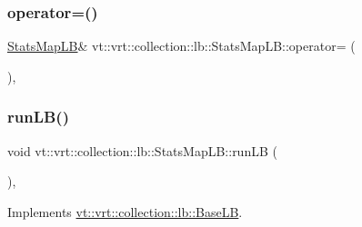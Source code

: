 \mbox{\label{structvt_1_1vrt_1_1collection_1_1lb_1_1_stats_map_l_b_aee5bfc8e45ac47056b8b22128bc0f86e}} 
\subsubsection{\texorpdfstring{operator=()}{operator=()}\hspace{0.1cm}{\footnotesize\ttfamily [2/2]}}
{\footnotesize\ttfamily \hyperlink{structvt_1_1vrt_1_1collection_1_1lb_1_1_stats_map_l_b}{Stats\+Map\+LB}\& vt\+::vrt\+::collection\+::lb\+::\+Stats\+Map\+L\+B\+::operator= (\begin{DoxyParamCaption}\item[{\hyperlink{structvt_1_1vrt_1_1collection_1_1lb_1_1_stats_map_l_b}{Stats\+Map\+LB} \&\&}]{ }\end{DoxyParamCaption})\hspace{0.3cm}{\ttfamily [default]}, {\ttfamily [noexcept]}}

\mbox{\label{structvt_1_1vrt_1_1collection_1_1lb_1_1_stats_map_l_b_a74ab28f522582cc78f77f2916884c6d8}} 
\subsubsection{\texorpdfstring{run\+L\+B()}{runLB()}}
{\footnotesize\ttfamily void vt\+::vrt\+::collection\+::lb\+::\+Stats\+Map\+L\+B\+::run\+LB (\begin{DoxyParamCaption}\item[{\hyperlink{namespacevt_a876a9d0cd5a952859c72de8a46881442}{Time\+Type}}]{ }\end{DoxyParamCaption})\hspace{0.3cm}{\ttfamily [override]}, {\ttfamily [virtual]}}



Implements \hyperlink{structvt_1_1vrt_1_1collection_1_1lb_1_1_base_l_b_a7caaf2483f046927fd7534a084a8c1b2}{vt\+::vrt\+::collection\+::lb\+::\+Base\+LB}.



